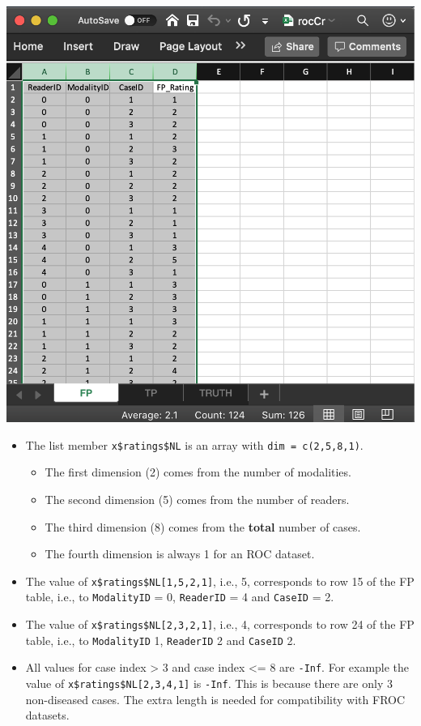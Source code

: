 \documentclass[
]{book}
\providecommand{\tightlist}{%
  \setlength{\itemsep}{0pt}\setlength{\parskip}{0pt}}
\begin{document}
\includegraphics[width=1\textwidth,height=\textheight]{images/quick-start/rocCrFp.png}

\begin{itemize}
\tightlist
\item
  The list member \texttt{x\$ratings\$NL} is an array with \texttt{dim\ =\ c(2,5,8,1)}.

  \begin{itemize}
  \tightlist
  \item
    The first dimension (2) comes from the number of modalities.
  \item
    The second dimension (5) comes from the number of readers.
  \item
    The third dimension (8) comes from the \textbf{total} number of cases.
  \item
    The fourth dimension is always 1 for an ROC dataset.
  \end{itemize}
\item
  The value of \texttt{x\$ratings\$NL{[}1,5,2,1{]}}, i.e., 5, corresponds to row 15 of the FP table, i.e., to \texttt{ModalityID} = 0, \texttt{ReaderID} = 4 and \texttt{CaseID} = 2.
\item
  The value of \texttt{x\$ratings\$NL{[}2,3,2,1{]}}, i.e., 4, corresponds to row 24 of the FP table, i.e., to \texttt{ModalityID} 1, \texttt{ReaderID} 2 and \texttt{CaseID} 2.
\item
  All values for case index \textgreater{} 3 and case index \textless= 8 are \texttt{-Inf}. For example the value of \texttt{x\$ratings\$NL{[}2,3,4,1{]}} is \texttt{-Inf}. This is because there are only 3 non-diseased cases. The extra length is needed for compatibility with FROC datasets.
\end{itemize}
\end{document}
